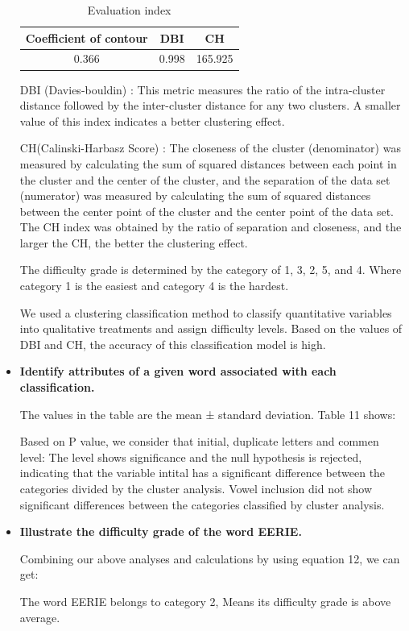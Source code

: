 \documentclass{mcmthesis}
\begin{document}
\begin{itemize}
\begin{table}[H]  %
    \centering        %
    \caption{Evaluation index}  %
    \vspace{0.1cm}
    \label{tab8}                       %
    \renewcommand\arraystretch{1.2}
    \begin{tabular}{ccc}  %
    \hline                    %
    Coefficient of contour & DBI &  CH \\ \hline
    0.366 & 0.998 & 165.925 \\ \hline
\end{tabular}
\end{table}

DBI (Davies-bouldin) : This metric measures the ratio of the intra-cluster distance followed by the inter-cluster distance for any two clusters. A smaller value of this index indicates a better clustering effect.

CH(Calinski-Harbasz Score) : The closeness of the cluster (denominator) was measured by calculating the sum of squared distances between each point in the cluster and the center of the cluster, and the separation of the data set (numerator) was measured by calculating the sum of squared distances between the center point of the cluster and the center point of the data set. The CH index was obtained by the ratio of separation and closeness, and the larger the CH, the better the clustering effect.

The difficulty grade is determined by the category of 1, 3, 2, 5, and 4. Where category 1 is the easiest and category 4 is the hardest.

We used a clustering classification method to classify quantitative variables into qualitative treatments and assign difficulty levels. Based on the values of DBI and CH, the accuracy of this classification model is high.

\item {\bf Identify attributes of a given word associated with each classification. }

The values in the table are the mean ± standard deviation. Table 11 shows: 

Based on P value, we consider that initial, duplicate letters and commen level: The level shows significance and the null hypothesis is rejected, indicating that the variable intital has a significant difference between the categories divided by the cluster analysis.
Vowel inclusion did not show significant differences between the categories classified by cluster analysis.

\item {\bf Illustrate the difficulty grade of the word EERIE.}
    
    Combining our above analyses and calculations by using equation 12, we can get:
    
    The word EERIE belongs to category 2, Means its difficulty grade is above average.


\end{itemize}
\end{document}
